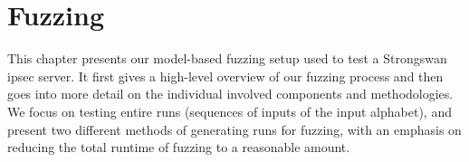%
%
% 
% 
% 

\chapter{Fuzzing}

\label{chap:Fuzzing}

\iffalse
\section{Environment Setup} \label{sec:fuzzenv}
We ran all our fuzzing tests in the same virtual network setup we used for our automata learning, on the same Ubuntu 22.04 LTS distributions. We again designated one \ac{vm} as the initiator which would send the fuzzed messages and the other one as the responder to create a typical client-server setup. All settings on the used VMs remained the same as while learning to ensure that no discrepancies were introduced by different environment settings. The \ac{sut} was also the same Strongswan server used for learning. The major difference to learning is that for fuzzing, we no longer require \textsc{AALpy}. Our only real dependency, apart from our mapper class, is the Python fuzzing framework boofuzz, version 0.4.1, which we use for input generation. 
\fi

This chapter presents our model-based fuzzing setup used to test a Strongswan \ac{ipsec} server. It first gives a high-level overview of our fuzzing process and then goes into more detail on the individual involved components and methodologies. We focus on testing entire runs (sequences of inputs of the input alphabet), and present two different methods of generating runs for fuzzing, with an emphasis on reducing the total runtime of fuzzing to a reasonable amount.

